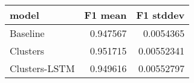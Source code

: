 \begin{tabular}{lrr}
\toprule
 model         &   F1 mean &   F1 stddev \\
\midrule
 Baseline      &  0.947567 &  0.0054365  \\
 Clusters      &  0.951715 &  0.00552341 \\
 Clusters-LSTM &  0.949616 &  0.00552797 \\
\bottomrule
\end{tabular}